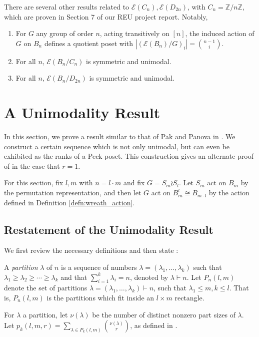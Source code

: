 \documentclass[smallextended]{svjour3}       %
\numberwithin{equation}{section}
\newcommand\ssec{\subsection}
\begin{document}
\begin{remark}
There are several other results related to $\mathcal E(C_n),\mathcal E(D_{2n})$, with $C_n = \mathbb Z/n\mathbb Z$, which are proven in Section 7 of our REU project report. Notably,
\begin{enumerate}
	\item For $G$ any group of order $n$, acting transitively on $[n]$, the induced action of $G$ on $B_n$ defines a quotient poset with $|(\mathcal E(B_n)/G)_i| = \binom {n-1} i$.
	\item For all $n$, $\mathcal E(B_n/C_n)$ is symmetric and unimodal.
	\item For all $n$, $\mathcal E(B_n/D_{2n})$ is symmetric and unimodal.
\end{enumerate}
\end{remark}



\section{A Unimodality Result}\label{sec:wreath_product}

In this section, we prove a result similar to that of Pak and Panova in \cite[Theorem 1.1]{pak}. We construct a certain sequence which is not only unimodal, but can even be exhibited as the ranks of a Peck poset. This construction gives an alternate proof of \cite[Theorem 1.1]{pak} in the case that $r = 1$.


For this section, fix $l,m$ with $n = l \cdot m$ and fix $G = S_m \wr S_l$. Let $S_m$ act on $B_m$ by the permutation representation, and then let $G$ act on $B_{m}^l\cong B_{m \cdot l}$ by the action defined in Definition \ref{defn:wreath_action}.

\ssec{Restatement of the Unimodality Result}
We first review the necessary definitions and then state \cite[Theorem 1.1]{pak}:

A {\it partition} $\lambda$ of $n$ is a sequence of numbers $\lambda = (\lambda_1,\ldots, \lambda_k)$ such that $\lambda_1 \geq \lambda_2 \geq \cdots \geq \lambda_k$ and that $\sum_{i=1}^k \lambda_i = n$, denoted by  $\lambda \vdash n$. Let $P_n(l,m)$ denote the set of partitions $\lambda = (\lambda_1,\ldots, \lambda_k) \vdash n$, such that $\lambda_1 \leq m,k \leq l$. That is, $P_n(l,m)$ is the partitions which fit inside an $l \times m$ rectangle.

For $\lambda$ a partition, let $\nu(\lambda)$ be the number of distinct nonzero part sizes of $\lambda$.  Let $p_k(l,m,r) = \sum_{\lambda \in P_k(l,m)} \binom{\nu(\lambda)}{r}$, as defined in \cite[Section 1]{pak}.
\end{document}
